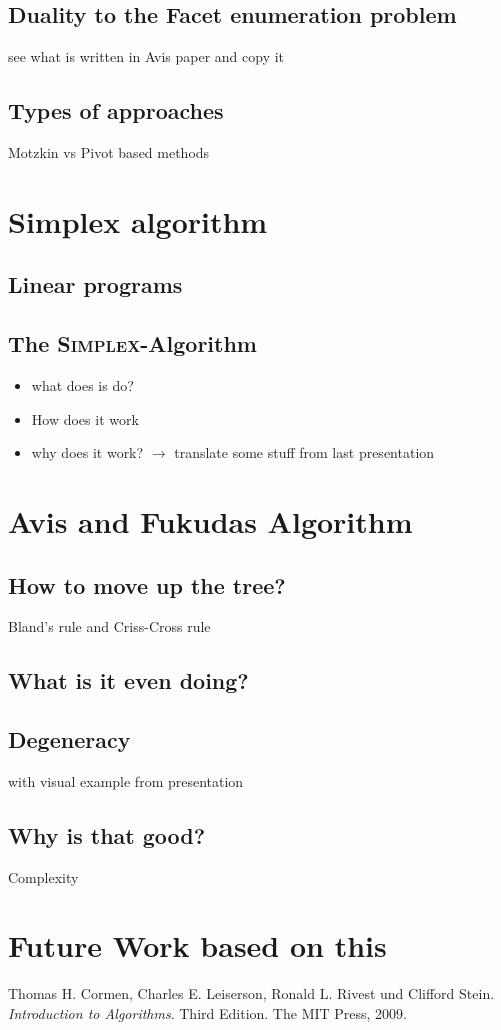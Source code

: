 \documentclass[a4paper, 11pt]{article}
\begin{document}
\subsection{Duality to the Facet enumeration problem}
see what is written in Avis paper and copy it

\subsection{Types of approaches}
Motzkin vs Pivot based methods

\section{Simplex algorithm}
\subsection{Linear programs}
\subsection{The \textsc{Simplex}-Algorithm}
\begin{itemize}
	\item what does is do?
	\item How does it work
	\item why does it work? $\rightarrow$ translate some stuff from last presentation
\end{itemize}

\section{Avis and Fukudas Algorithm}
\subsection{How to move up the tree?}
Bland's rule and Criss-Cross rule
\subsection{What is it even doing?}
\subsection{Degeneracy}
with visual example from presentation
\subsection{Why is that good?}
Complexity

\section{Future Work based on this }

\newpage

\begin{thebibliography}{9}
	Thomas H. Cormen, Charles E. Leiserson, Ronald L. Rivest und Clifford Stein.
	\textit{Introduction to Algorithms}. Third Edition. The MIT Press, 2009.
\end{thebibliography}
\end{document}
